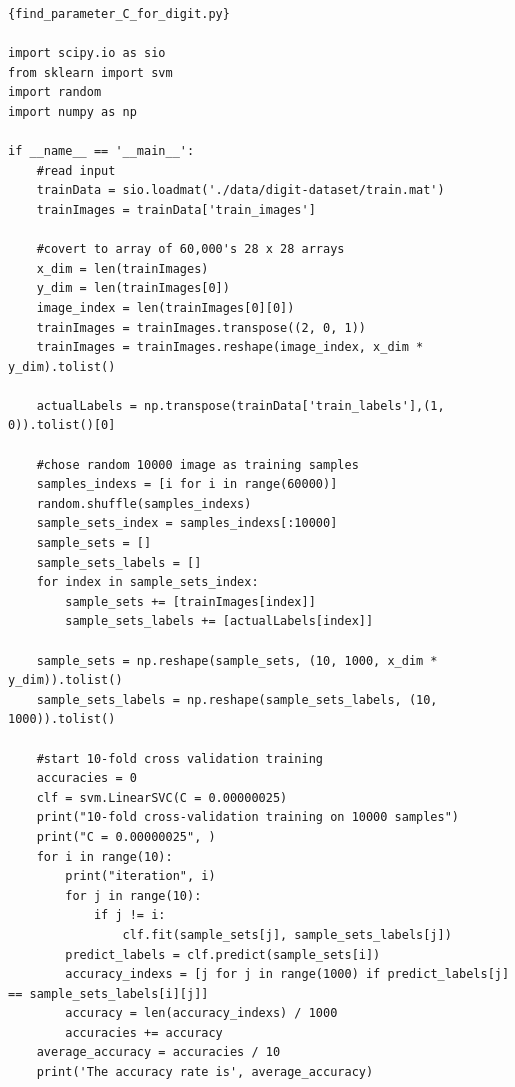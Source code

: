 \documentclass[11pt]{article}
\begin{document}
\newpage
\begin{lstlisting}
{find_parameter_C_for_digit.py}

import scipy.io as sio
from sklearn import svm
import random
import numpy as np

if __name__ == '__main__':
	#read input
	trainData = sio.loadmat('./data/digit-dataset/train.mat')
	trainImages = trainData['train_images']

	#covert to array of 60,000's 28 x 28 arrays
	x_dim = len(trainImages)
	y_dim = len(trainImages[0])
	image_index = len(trainImages[0][0])
	trainImages = trainImages.transpose((2, 0, 1))
	trainImages = trainImages.reshape(image_index, x_dim * y_dim).tolist()

	actualLabels = np.transpose(trainData['train_labels'],(1, 0)).tolist()[0]

	#chose random 10000 image as training samples
	samples_indexs = [i for i in range(60000)]
	random.shuffle(samples_indexs)
	sample_sets_index = samples_indexs[:10000]
	sample_sets = []
	sample_sets_labels = []
	for index in sample_sets_index:
		sample_sets += [trainImages[index]]
		sample_sets_labels += [actualLabels[index]]

	sample_sets = np.reshape(sample_sets, (10, 1000, x_dim * y_dim)).tolist()
	sample_sets_labels = np.reshape(sample_sets_labels, (10, 1000)).tolist()

	#start 10-fold cross validation training
	accuracies = 0
	clf = svm.LinearSVC(C = 0.00000025)
	print("10-fold cross-validation training on 10000 samples")
	print("C = 0.00000025", )
	for i in range(10):
		print("iteration", i)
		for j in range(10):
			if j != i:
				clf.fit(sample_sets[j], sample_sets_labels[j])
		predict_labels = clf.predict(sample_sets[i])
		accuracy_indexs = [j for j in range(1000) if predict_labels[j] == sample_sets_labels[i][j]]
		accuracy = len(accuracy_indexs) / 1000
		accuracies += accuracy
	average_accuracy = accuracies / 10
	print('The accuracy rate is', average_accuracy)



\end{lstlisting}
\end{document}
